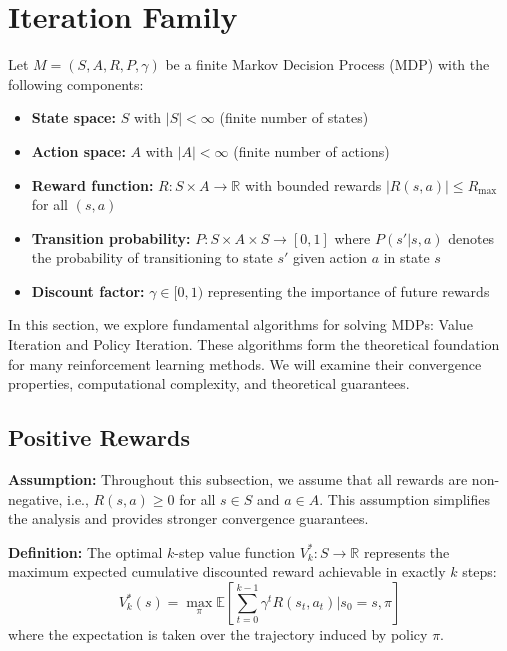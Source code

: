 \documentclass[12pt]{article}
\begin{document}
\section{Iteration Family}
\label{sec:iteration_family}

Let \( M = (S, A, R, P, \gamma) \) be a finite Markov Decision Process (MDP) with the following components:
\begin{itemize}
    \item \textbf{State space:} \( S \) with \( |S| < \infty \) (finite number of states)
    \item \textbf{Action space:} \( A \) with \( |A| < \infty \) (finite number of actions)
    \item \textbf{Reward function:} \( R: S \times A \rightarrow \mathbb{R} \) with bounded rewards \( |R(s,a)| \leq R_{\text{max}} \) for all \( (s,a) \)
    \item \textbf{Transition probability:} \( P: S \times A \times S \rightarrow [0,1] \) where \( P(s'|s,a) \) denotes the probability of transitioning to state \( s' \) given action \( a \) in state \( s \)
    \item \textbf{Discount factor:} \( \gamma \in [0, 1) \) representing the importance of future rewards
\end{itemize}

In this section, we explore fundamental algorithms for solving MDPs: Value Iteration and Policy Iteration. These algorithms form the theoretical foundation for many reinforcement learning methods. We will examine their convergence properties, computational complexity, and theoretical guarantees.

\subsection{Positive Rewards}
\label{subsec:positive_rewards}

\textbf{Assumption:} Throughout this subsection, we assume that all rewards are non-negative, i.e., \( R(s, a) \geq 0 \) for all \( s \in S \) and \( a \in A \). This assumption simplifies the analysis and provides stronger convergence guarantees.

\textbf{Definition:} The optimal \( k \)-step value function \( V_k^*: S \rightarrow \mathbb{R} \) represents the maximum expected cumulative discounted reward achievable in exactly \( k \) steps:
\begin{equation}
V_k^*(s) = \max_{\pi} \mathbb{E}\left[\sum_{t=0}^{k-1} \gamma^t R(s_t, a_t) \Big| s_0 = s, \pi\right]
\end{equation}
where the expectation is taken over the trajectory induced by policy \( \pi \).
\end{document}
